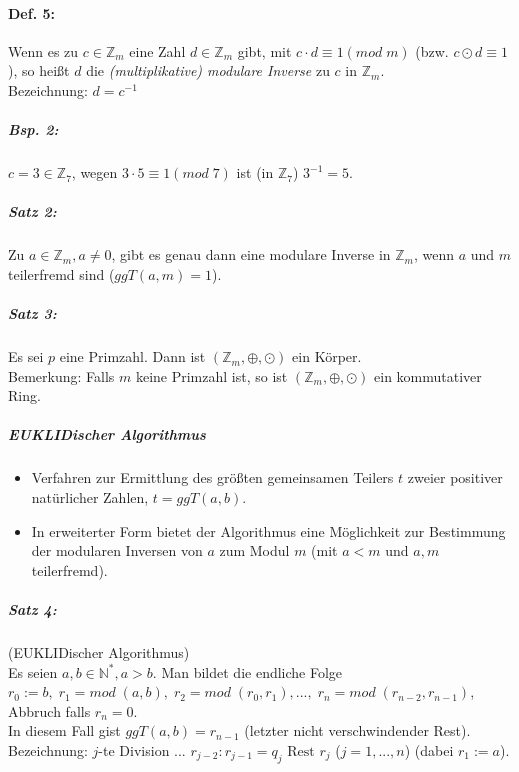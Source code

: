 \paragraph{Def. 5:} \parskp
Wenn es zu $c \in \mathbb{Z}_m$ eine Zahl $d\in \mathbb{Z}_m$ gibt, mit $c\cdot d \equiv 1 (mod \; m)$ (bzw. $c\odot d \equiv 1$), so heißt $d$ die \emph{(multiplikative) modulare Inverse} zu $c$ in $\mathbb{Z}_m$.\\
Bezeichnung: $d=c^{-1}$
\subparagraph{Bsp. 2:} \parskp
$c=3 \in \mathbb{Z}_7$, wegen $3 \cdot 5 \equiv 1 (mod \; 7)$ ist (in $\mathbb{Z}_7$) $3^{-1}=5$.
\subparagraph{Satz 2:} Zu $a \in \mathbb{Z}_m, a \not = 0$, gibt es genau dann eine modulare Inverse in $\mathbb{Z}_m$, wenn $a$ und $m$ teilerfremd sind ($ggT(a,m)=1$).
\subparagraph{Satz 3:} Es sei $p$ eine Primzahl. Dann ist $(\mathbb{Z}_m, \oplus, \odot)$ ein Körper.\\
Bemerkung: Falls $m$ keine Primzahl ist, so ist $(\mathbb{Z}_m, \oplus, \odot)$ ein kommutativer Ring.
\subparagraph*{EUKLIDischer Algorithmus}
\begin{itemize}
\item Verfahren zur Ermittlung des größten gemeinsamen Teilers $t$ zweier positiver natürlicher Zahlen, $t=ggT(a,b)$.
\item In erweiterter Form bietet der Algorithmus eine Möglichkeit zur Bestimmung  der modularen Inversen von $a$ zum Modul $m$ (mit $a<m$ und $a,m$ teilerfremd).
\end{itemize}

\subparagraph{Satz 4:} (EUKLIDischer Algorithmus)\\
Es seien $a,b \in \mathbb{N}^*, a>b$. Man bildet die endliche Folge \\
$r_0:= b, \; r_1=mod \;(a,b), \;r_2 = mod \; (r_0,r_1),...,\;r_n = mod \; (r_{n-2}, r_{n-1})$, Abbruch falls $r_n=0$.\\
In diesem Fall gist $\boxed{ggT(a,b)=r_{n-1}}$ (letzter nicht verschwindender Rest).\\
Bezeichnung: $j$-te Division ... $\boxed{r_{j-2}:r_{j-1}= q_j\text{ Rest } r_j}$ ($j=1,...,n$) (dabei $r_1:=a$).

